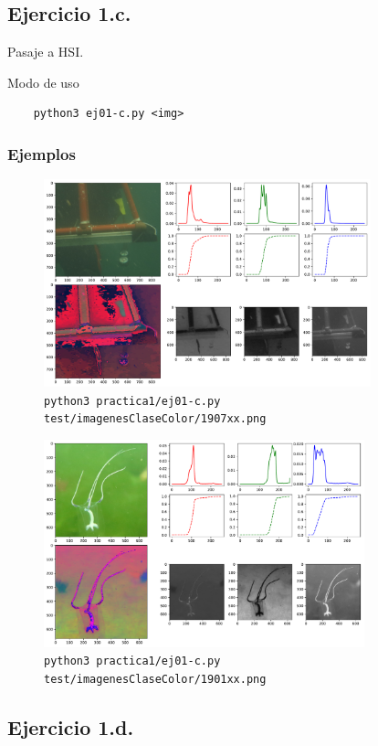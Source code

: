 \documentclass[11pt, spanish]{article}
\begin{document}
\subsection{Ejercicio 1.c.}

Pasaje a HSI.

Modo de uso
\begin{verbatim}
    python3 ej01-c.py <img>
\end{verbatim}

\subsubsection*{Ejemplos}
\begin{figure}[H]
\centering
  \includegraphics[height=6cm]{informe-imgs/ej01-c-1.pdf}
  \caption{\texttt{python3 practica1/ej01-c.py test/imagenesClaseColor/1907xx.png}}
\end{figure}
\begin{figure}[H]
\centering
  \includegraphics[height=6cm]{informe-imgs/ej01-c-2.pdf}
  \caption{\texttt{python3 practica1/ej01-c.py test/imagenesClaseColor/1901xx.png}}
\end{figure}

\subsection{Ejercicio 1.d.}
\end{document}
